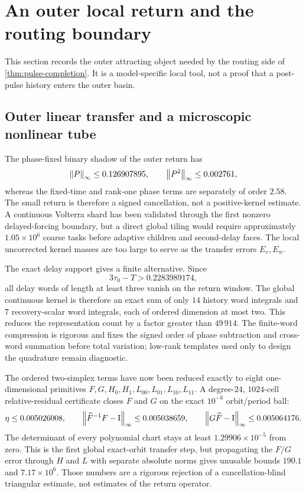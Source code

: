 \section{An outer local return and the routing boundary}\label{sec:outer-return}

This section records the outer attracting object needed by the routing side of
\cref{thm:pulse-completion}.  It is a model-specific local tool, not a proof
that a post-pulse history enters the outer basin.

\subsection{Outer linear transfer and a microscopic nonlinear tube}

The phase-fixed binary shadow of the outer return has
\[
 \left\lVert P\right\rVert_{\infty}\le0.126907895,\qquad
 \left\lVert P^2\right\rVert_{\infty}\le0.002761,
\]
whereas the fixed-time and rank-one phase terms are separately of order
\(2.58\).  The small return is therefore a signed cancellation, not a
positive-kernel estimate.  A continuous Volterra shard has been validated
through the first nonzero delayed-forcing boundary, but a direct global
tiling would require approximately \(1.05\times10^6\) coarse tasks before
adaptive children and second-delay faces.  The local uncorrected kernel
masses are too large to serve as the transfer errors \(E_v,E_w\).

The exact delay support gives a finite alternative.  Since
\[
 3\tau_0-T>0.2283989174,
\]
all delay words of length at least three vanish on the return window.  The
global continuous kernel is therefore an exact sum of only \(14\) history
word integrals and \(7\) recovery-scalar word integrals, each of ordered
dimension at most two.  This reduces the representation count by a factor
greater than \(49\,914\).  The finite-word compression is rigorous and fixes
the signed order of phase subtraction and cross-word summation before total
variation; low-rank templates used only to design the quadrature remain
diagnostic.

The ordered two-simplex terms have now been reduced exactly to eight
one-dimensional primitives \(F,G,H_0,H_1,L_{00},L_{01},L_{10},L_{11}\).
A degree-\(24\), \(1024\)-cell relative-residual certificate closes \(F\)
and \(G\) on the exact \(10^{-8}\) orbit/period ball:
\begin{equation}
 \eta\le0.005026008,\qquad
 \left\lVert\widehat F^{-1}F-\mathrm I\right\rVert_\infty\le0.005038659,\qquad
 \left\lVert G\widehat F-\mathrm I\right\rVert_\infty\le0.005064176.           \label{eq:outer-relative-residual}
\end{equation}
The determinant of every polynomial chart stays at least
\(1.29906\times10^{-5}\) from zero.  This is the first global exact-orbit
transfer step, but propagating the \(F/G\) error through \(H\) and \(L\)
with separate absolute norms gives unusable bounds \(190.1\) and
\(7.17\times10^6\).  Those numbers are a rigorous rejection of a
cancellation-blind triangular estimate, not estimates of the return
operator.

